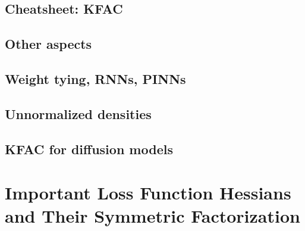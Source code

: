 \documentclass{article}
\begin{document}
\clearpage
\begin{paracol}{1}
  \section{Cheatsheet: KFAC}
  
  \end{paracol}
\clearpage

\begin{paracol}{2}
  \section{Other aspects}
  \subsection{Weight tying, RNNs, PINNs}
  \subsection{Unnormalized densities}
  \subsection{KFAC for diffusion models}
\end{paracol}

\clearpage


\appendix

\section{Important Loss Function Hessians and Their Symmetric Factorization}\label{app:loss_function_hessians}

\end{document}
